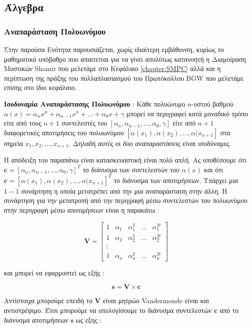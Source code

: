 \subsection{Άλγεβρα}

\subsubsection{Αναπαράσταση Πολυωνύμου}

Στην παρούσα Ενότητα παρουσιάζεται, χωρίς ιδιαίτερη εμβάθυνση, κυρίως το μαθηματικό υπόβαθρο που απαιτείται για να γίνει απολύτως κατανοητή η Διαμοίραση Μυστικών Shamir που μελετάμε στο Κεφάλαιο \ref{chapter:SMPC} αλλά και η περίπτωση της πράξης του πολλαπλασιασμού του Πρωτόκολλου BGW που μελετάμε επίσης στο ίδιο κεφάλαιο.

\begin{theorem}
\textbf{Ισοδυναμία Αναπαράστασης Πολυωνύμου} : Κάθε πολυώνυμο $n$-οστού βαθμού $α(x) = α_nx^n + α_{n-1}x^n + \ldots + α_0x + γ$ μπορεί να περιγραφεί κατά μοναδικό τρόπο είτε από τους $n+1$ συντελεστές του $[α_n, α_{n-1}, \ldots, α_0, γ]$ είτε από $n+1$ διαφορετικές αποτιμήσεις του πολυωνύμου $[α(x_1), α(x_2), \ldots, α(x_{n+1}]$ στα σημεία $x_1, x_2, \ldots, x_{n+1}$. Δηλαδή αυτές οι δύο αναπαραστάσεις είναι ισοδύναμες.
\end{theorem}

Η απόδειξη του παραπάνω είναι κατασκευαστική είναι πολύ απλή. Ας υποθέσουμε ότι $\mathbf{c} = [α_n, α_{n-1}, \ldots, α_0, γ]^T$ το διάνυσμα των συντελεστών του $α(x)$ και ότι $\mathbf{c} = [α(x_1), α(x_2), \ldots, α(x_{n+1}]^T$ το διάνυσμα των αποτιμήσεων. Υπάρχει μια $1-1$ συνάρτηση η οποία μετατρέπει από την μια αναπαράσταση στην άλλη. H συνάρτηση για την μετατροπή από την περιγραφή μέσω συντελεστών του πολυωνύμου στην περιγραφή μέσω αποτιμήσεων είναι η παρακάτω : 

$$
    \mathbf{V} = 
    \begin{bmatrix}
    1 & α_{1} & α_{1}^{2} & \ldots & α_{1}^{2 t} \\
    1 & α_{2} & α_{2}^{2} & \ldots & α_{2}^{2 t} \\
    \vdots & & & & \\
    1 & α_{n} & α_{n}^{2} & \ldots & α_{n}^{2 t}
    \end{bmatrix}
$$

και μπορεί να εφαρμοστεί ως εξής :

$$
     \mathbf{s} = \mathbf{V} \times \mathbf{c}
$$

Αντίστοιχα μπορούμε επειδή το $\mathbf{V}$ είναι μητρώο Vandermonde είναι και αντιστρέψιμο. Έτσι μπορούμε να υπολογίσουμε το διάνυσμα συντελεστών $\mathbf{c}$ από το διάνυσμα αποτιμήσεων $\mathbf{s}$ ως εξης :

